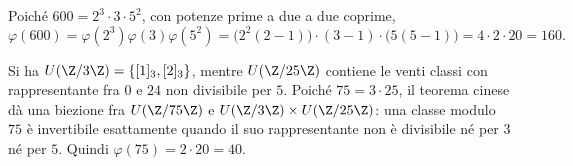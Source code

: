 \begin{esempio}
Poiché $600=2^3\cdot3\cdot5^2$, con potenze prime a due a due coprime,
\[
\varphi(600)=\varphi(2^3)\varphi(3)\varphi(5^2)
           =\bigl(2^2(2-1)\bigr)\cdot(3-1)\cdot\bigl(5(5-1)\bigr)
           =4\cdot2\cdot20=160.
\]
\end{esempio}

\begin{esempio}
Si ha $U(\Z/3\Z)=\{[1]_3,[2]_3\}$, mentre $U(\Z/25\Z)$ contiene le venti classi con rappresentante fra $0$ e $24$ non divisibile per $5$. Poiché $75=3\cdot25$, il teorema cinese dà una biezione fra $U(\Z/75\Z)$ e $U(\Z/3\Z)\times U(\Z/25\Z)$: una classe modulo $75$ è invertibile esattamente quando il suo rappresentante non è divisibile né per $3$ né per $5$. Quindi $\varphi(75)=2\cdot20=40$.
\end{esempio}









